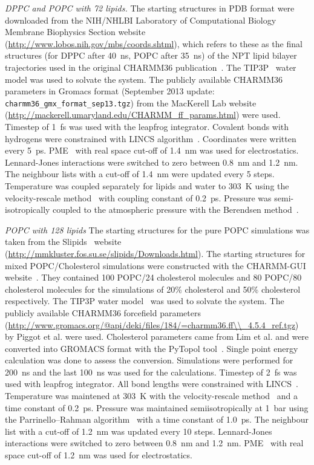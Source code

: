 \documentclass[journal=jacsat,manuscript=article]{achemso}
\begin{document}
{\it DPPC and POPC with 72 lipids.}
%
The starting structures in PDB format were downloaded from the
NIH/NHLBI Laboratory of Computational Biology Membrane Biophysics Section
website (\url{http://www.lobos.nih.gov/mbs/coords.shtml}),
which refers to these as the final structures (for DPPC after 40~ns, POPC after 35~ns)
of the NPT lipid bilayer trajectories used in the original CHARMM36 publication~\cite{klauda10}.
The TIP3P~\cite{jorgensen83} water model was used to solvate the system.
%
The publicly available CHARMM36 parameters in Gromacs format
(September 2013 update: {\tt charmm36\_gmx\_format\_sep13.tgz})
from the MacKerell Lab website
(\url{http://mackerell.umaryland.edu/CHARMM_ff_params.html}) were used.
Timestep of 1~fs was used with the leapfrog integrator. Covalent bonds with hydrogens were constrained with LINCS algorithm~\cite{hess97,hess07}. 
Coordinates were written every 5~ps. PME~\cite{darden93,essman95} with real space cut-off of 1.4~nm was used 
for electrostatics. Lennard-Jones interactions were switched to zero between 0.8~nm and 1.2~nm.
The neighbour lists with a cut-off of 1.4~nm were updated every 5 steps. Temperature was coupled separately
for lipids and water to 303~K using the velocity-rescale method~\cite{bussi07} with coupling constant of 0.2~ps.
Pressure was semi-isotropically coupled to the atmospheric pressure with the Berendsen method~\cite{berendsen84}.

{\it POPC with 128 lipids}
The starting structures for the pure POPC simulations was taken from the Slipids~\cite{jambeck12b} website (\url{http://mmkluster.fos.su.se/slipids/Downloads.html}).
The starting structures for mixed POPC/Cholesterol simulations were constructed with the CHARMM-GUI website~\cite{jo08}. 
They contained 100 POPC/24 cholesterol molecules and 80 POPC/80 cholesterol molecules for
the simulations of 20\% cholesterol and 50\% cholesterol respectively. The TIP3P water model~\cite{jorgensen83} was used to
solvate the system.
The publicly available CHARMM36 forcefield parameters
(\url{http://www.gromacs.org/@api/deki/files/184/=charmm36.ff\\\_4.5.4\_ref.tgz}) 
by Piggot et al. \cite{piggot12} were used. Cholesterol parameters came
from Lim et al. \cite{lim12} and were converted into GROMACS format with the PyTopol tool~\cite{salari15}.  
Single point energy calculation was done to assess the conversion. 
Simulations were performed for 200~ns and the last 100~ns was used for the calculations. Timestep of 2~fs was
used with leapfrog integrator. All bond lengths were constrained with LINCS~\cite{hess97,hess07}. Temperature was maintened at
303~K with the velocity-rescale method~\cite{bussi07} and a time constant of 0.2~ps. Pressure was maintained semiisotropically
at 1~bar using the Parrinello--Rahman algorithm~\cite{parrinello81} with a time constant of 1.0~ps. The neighbour list with a cut-off of 1.2~nm
was updated every 10 steps. Lennard-Jones interactions were switched to zero
between 0.8~nm and 1.2~nm. PME~\cite{darden93,essman95} with real space cut-off of 1.2~nm was used for electrostatics.
\end{document}
